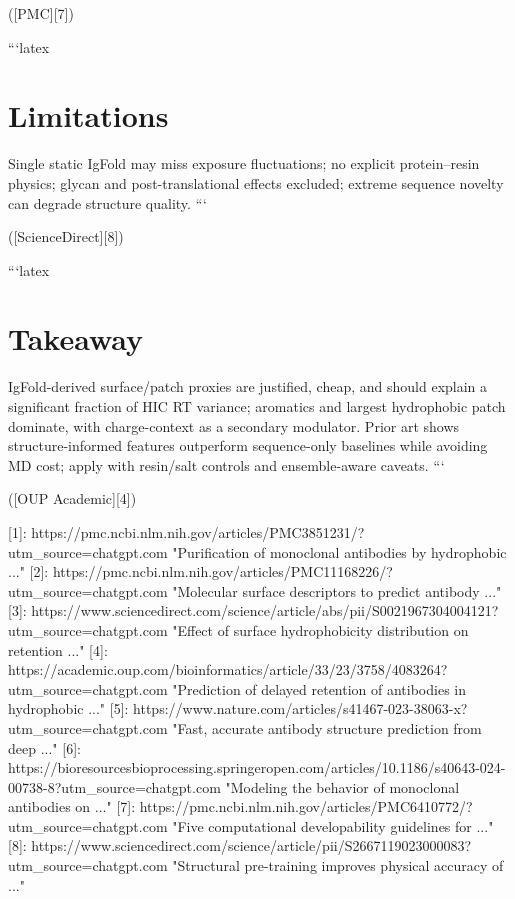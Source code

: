 ([PMC][7])

```latex
\section*{Limitations}

Single static IgFold may miss exposure fluctuations; no explicit protein–resin physics; glycan and post-translational effects excluded; extreme sequence novelty can degrade structure quality.
```

([ScienceDirect][8])

```latex
\section*{Takeaway}

IgFold-derived surface/patch proxies are justified, cheap, and should explain a significant fraction of HIC RT variance; aromatics and largest hydrophobic patch dominate, with charge-context as a secondary modulator. Prior art shows structure-informed features outperform sequence-only baselines while avoiding MD cost; apply with resin/salt controls and ensemble-aware caveats.
```

([OUP Academic][4])

[1]: https://pmc.ncbi.nlm.nih.gov/articles/PMC3851231/?utm_source=chatgpt.com "Purification of monoclonal antibodies by hydrophobic ..."
[2]: https://pmc.ncbi.nlm.nih.gov/articles/PMC11168226/?utm_source=chatgpt.com "Molecular surface descriptors to predict antibody ..."
[3]: https://www.sciencedirect.com/science/article/abs/pii/S0021967304004121?utm_source=chatgpt.com "Effect of surface hydrophobicity distribution on retention ..."
[4]: https://academic.oup.com/bioinformatics/article/33/23/3758/4083264?utm_source=chatgpt.com "Prediction of delayed retention of antibodies in hydrophobic ..."
[5]: https://www.nature.com/articles/s41467-023-38063-x?utm_source=chatgpt.com "Fast, accurate antibody structure prediction from deep ..."
[6]: https://bioresourcesbioprocessing.springeropen.com/articles/10.1186/s40643-024-00738-8?utm_source=chatgpt.com "Modeling the behavior of monoclonal antibodies on ..."
[7]: https://pmc.ncbi.nlm.nih.gov/articles/PMC6410772/?utm_source=chatgpt.com "Five computational developability guidelines for ..."
[8]: https://www.sciencedirect.com/science/article/pii/S2667119023000083?utm_source=chatgpt.com "Structural pre-training improves physical accuracy of ..."
